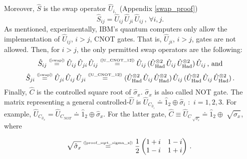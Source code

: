 \documentclass[11pt]{article}
\numberwithin{equation}{section} %
\numberwithin{figure}{section} %
\newcommand\numeq[1] %
  {\stackrel{\scriptscriptstyle(\mkern-1.5mu#1\mkern-1.5mu)}{=}}
\begin{document}
Moreover, $\hat{S}$ is the swap operator $\hat{U}_{i,}$ (Appendix \ref{swap_proof}) $\,\,\,$ \cite[p.~xxxi, l.~2]{Nielsen} 
\begin{equation} \label{swap}
\hat{S}_{ij}=\hat{U}_{ij}\,\hat{U}_{ji}\,\hat{U}_{ij}\,\textrm{,}\,\,\forall i,j.
\end{equation}
As mentioned, experimentally, IBM's quantum computers only allow the implementation of $\hat{U}_{ij}$, $i>j$, CNOT gates. That is, $\hat{U}_{ji}$, $i>j$, gates are not allowed. Then, for $i>j$, the only permitted swap operators are the following:
\begin{equation} \label{S_ij}
\hat{S}_{ij}\numeq{\textrm{\ref{swap}}}\hat{U}_{ij}\,\hat{U}_{ji}\,\hat{U}_{ij} \numeq{\textrm{\ref{U_CNOT_12}}} \hat{U}_{ij}\,(\hat{U}_{\textrm{Had}}^{\otimes 2}\,\hat{U}_{ij}\,\hat{U}_{\textrm{Had}}^{\otimes 2})\,\hat{U}_{ij}\,\textrm{, and}
\end{equation}
\begin{equation} \label{S_ji}
\hat{S}_{ji}\numeq{\textrm{\ref{swap}}}\hat{U}_{ji}\,\hat{U}_{ij}\,\hat{U}_{ji} \numeq{\textrm{\ref{U_CNOT_12}}} (\hat{U}_{\textrm{Had}}^{\otimes 2}\,\hat{U}_{ij}\,\hat{U}_{\textrm{Had}}^{\otimes 2})\,\hat{U}_{ij}\,(\hat{U}_{\textrm{Had}}^{\otimes 2}\,\hat{U}_{ij}\,\hat{U}_{\textrm{Had}}^{\otimes 2})\,.
\end{equation}
Finally, $\hat{C}$ is the controlled square root of $\hat{\sigma}_x$. $\hat{\sigma}_x$ is also called NOT gate. The matrix representing a general controlled-$\hat{U}$ is $\hat{U}_{C_{\hat{\sigma}_i}}\doteq \hat{1}_2 \oplus \hat{\sigma}_i$ $:$ $i=1,2,3$. For example, $\hat{U}_{C_{\hat{\sigma}_x}}=\hat{U}_{C_{NOT}}\doteq \hat{1}_2\oplus \hat{\sigma}_x$. For the latter gate, $\hat{C} \equiv \hat{U}_{C_{\sqrt[]{\hat{\sigma}_x}}}\doteq \hat{1}_2\oplus \sqrt[]{\hat{\sigma}_x}$, where 

\begin{equation} \label{sqrt_sigma_x}
\sqrt[]{\hat{\sigma}_x} \numeq{\textrm{\ref{proof_sqrt_sigma_x}}} \frac{1}{2}\begin{pmatrix} 1+i & 1-i \\ 1-i & 1+i
\end{pmatrix}\,\textrm{.}
\end{equation}
\end{document}
